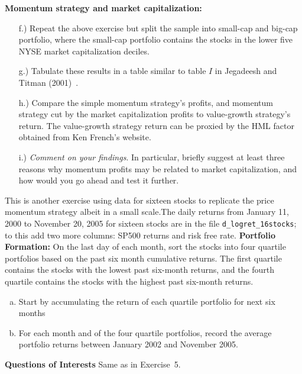 \textbf{Momentum strategy and market capitalization:}
	\begin{enumerate}
	\item[f.)] Repeat the above exercise but split the sample into small-cap and big-cap portfolio, where the small-cap portfolio contains the stocks in the lower five NYSE market capitalization deciles.
	\item[g.)] Tabulate these results in a table similar to table $I$ in Jegadeesh
and Titman (2001)~\cite{}.
	\item[h.)] Compare the simple momentum strategy's profits, and momentum strategy cut by the market capitalization profits to value-growth strategy's return. The value-growth strategy return can be proxied by the HML factor obtained from Ken French's website.
	\item[i.)] \emph{Comment on your findings}. In particular, briefly suggest at least three reasons why momentum profits may be related to market capitalization, and how would you go ahead and test it further.
	\end{enumerate}


\prob This is another exercise using data for sixteen stocks to replicate the price momentum strategy albeit in a small scale.The daily returns from January 11, 2000 to November 20, 2005 for sixteen stocks are in the file \texttt{d\_logret\_16stocks};
to this add two more columns: SP500 returns and risk free rate.
    \textbf{Portfolio Formation:} \hfill \break
    On the last day of each month, sort the stocks into four quartile portfolios based on the past six month
cumulative returns. The first quartile contains the stocks with the lowest past six-month returns, and the
fourth quartile contains the stocks with the highest past six-month returns.
        \begin{enumerate}[(a)]
        \item Start by accumulating the return of each quartile portfolio for next six months
        \item For each month and of the four quartile portfolios, record the average portfolio returns between January 2002 and November 2005.
        \end{enumerate}
    \textbf{Questions of Interests} \hfill \break
    Same as in Exercise~5. \\


